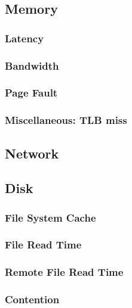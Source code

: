\documentclass[paper=letter]{article}
\begin{document}
\newpage

\subsection{Memory}

\subsubsection{Latency}

\newpage

\subsubsection{Bandwidth}

\newpage

\subsubsection{Page Fault}

\newpage

\subsubsection{Miscellaneous: TLB miss}
\newpage
\subsection{Network}

\newpage
\subsection{Disk}

\subsubsection{File System Cache}\newpage

\subsubsection{File Read Time}\newpage

\subsubsection{Remote File Read Time}\newpage

\subsubsection{Contention}\newpage

\newpage

\printbibliography
\end{document}
